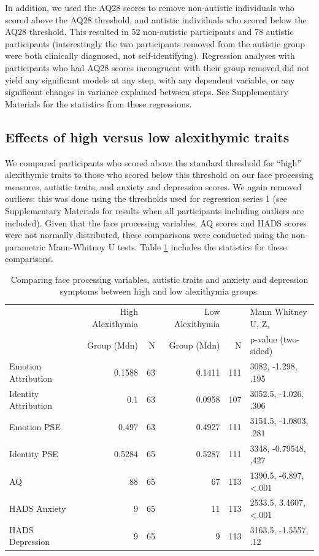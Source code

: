\documentclass[
]{article}
\begin{document}
In addition, we used the AQ28 scores to remove non-autistic individuals who scored above the AQ28 threshold, and autistic individuals who scored below the AQ28 threshold. This resulted in 52 non-autistic participants and 78 autistic participants (interestingly the two participants removed from the autistic group were both clinically diagnosed, not self-identifying). Regression analyses with participants who had AQ28 scores incongruent with their group removed did not yield any significant models at any step, with any dependent variable, or any significant changes in variance explained between steps. See Supplementary Materials for the statistics from these regressions.

\hypertarget{effects-of-high-versus-low-alexithymic-traits}{%
\subsection*{Effects of high versus low alexithymic traits}\label{effects-of-high-versus-low-alexithymic-traits}}

We compared participants who scored above the standard threshold for ``high'' alexithymic traits to those who scored below this threshold on our face processing measures, autistic traits, and anxiety and depression scores. We again removed outliers: this was done using the thresholds used for regression series 1 (see Supplementary Materials for results when all participants including outliers are included). Given that the face processing variables, AQ scores and HADS scores were not normally distributed, these comparisons were conducted using the non-parametric Mann-Whitney U tests. Table \ref{tab:table9} includes the statistics for these comparisons.

\begin{table}[H]

\caption{\label{tab:table9}Comparing face processing variables, autistic traits and anxiety and depression symptoms between high and low alexithymia groups.}
\centering
\begin{tabular}[t]{lrrrrl}
\toprule
 & High Alexithymia &  & Low Alexithymia &  & Mann Whitney U, Z,\\
 & Group (Mdn) & N & Group (Mdn) & N & p-value (two-sided)\\
\midrule
Emotion Attribution & 0.1588 & 63 & 0.1411 & 111 & 3082, -1.298, .195\\
Identity Attribution & 0.1 & 63 & 0.0958 & 107 & 3052.5, -1.026, .306\\
Emotion PSE & 0.497 & 63 & 0.4927 & 111 & 3151.5, -1.0803, .281\\
\addlinespace
Identity PSE & 0.5284 & 65 & 0.5287 & 111 & 3348, -0.79548, .427\\
AQ & 88 & 65 & 67 & 113 & 1390.5, -6.897, <.001\\
HADS Anxiety & 9 & 65 & 11 & 113 & 2533.5, 3.4607, <.001\\
HADS Depression & 9 & 65 & 9 & 113 & 3163.5, -1.5557, .12\\
\bottomrule
\end{tabular}
\end{table}
\end{document}
